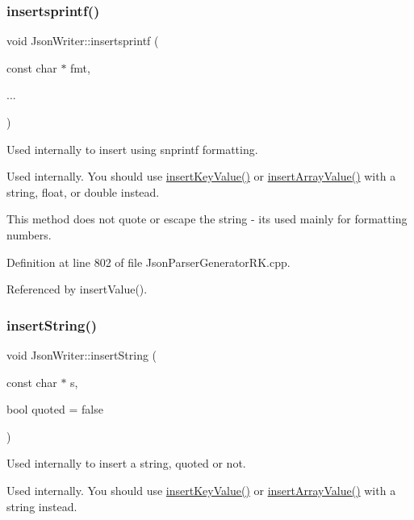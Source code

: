 \subsubsection{\texorpdfstring{insertsprintf()}{insertsprintf()}}
{\footnotesize\ttfamily void Json\+Writer\+::insertsprintf (\begin{DoxyParamCaption}\item[{const char $\ast$}]{fmt,  }\item[{}]{... }\end{DoxyParamCaption})}



Used internally to insert using snprintf formatting. 

Used internally. You should use \hyperlink{class_json_writer_ac2de627389b59ce2c8ed95e10ea213bf}{insert\+Key\+Value()} or \hyperlink{class_json_writer_a8b4dc6726b66b4f277c7674e60c8a057}{insert\+Array\+Value()} with a string, float, or double instead.

This method does not quote or escape the string -\/ it\textquotesingle{}s used mainly for formatting numbers. 

Definition at line 802 of file Json\+Parser\+Generator\+R\+K.\+cpp.



Referenced by insert\+Value().

\mbox{\label{class_json_writer_acf5ad9145b651c78873a71abbe372c9b}} 
\subsubsection{\texorpdfstring{insert\+String()}{insertString()}}
{\footnotesize\ttfamily void Json\+Writer\+::insert\+String (\begin{DoxyParamCaption}\item[{const char $\ast$}]{s,  }\item[{bool}]{quoted = {\ttfamily false} }\end{DoxyParamCaption})}



Used internally to insert a string, quoted or not. 

Used internally. You should use \hyperlink{class_json_writer_ac2de627389b59ce2c8ed95e10ea213bf}{insert\+Key\+Value()} or \hyperlink{class_json_writer_a8b4dc6726b66b4f277c7674e60c8a057}{insert\+Array\+Value()} with a string instead. 

